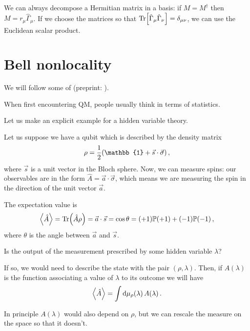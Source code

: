 \documentclass[main.tex]{subfiles}
\begin{document}

We can always decompose a Hermitian matrix in a basis: if \(M = M ^\dag\) then \(M = r_{\mu } \hat{\Gamma}_{\mu } \).
If we choose the matrices so that \(\Tr [\hat{\Gamma}_{\mu } \hat{\Gamma}_{\nu }] = \delta_{\mu \nu }\), we can use the Euclidean scalar product. 

\section{Bell nonlocality}

We will follow some of \cite[]{RevModPhysa} (preprint: \cite[]{brunnerBellNonlocality2014}). 

When first encountering QM, people usually think in terms of statistics. 

Let us make an explicit example for a hidden variable theory. 

Let us suppose we have a qubit which is described by the density matrix 
%
\begin{align}
\rho = \frac{1}{2} \qty(\mathbb{1} + \vec{s} \cdot \vec{\sigma})
\,,
\end{align}
%
where \(\vec{s}\) is a unit vector in the Bloch sphere. 
Now, we can measure spins: our observables are in the form \(\hat{A} = \vec{a} \cdot \vec{\sigma}\), which means we are measuring the spin in the direction of the unit vector \(\vec{a}\). 

The expectation value is 
%
\begin{align}
\expval{\hat{A}} = \Tr (\hat{A} \rho ) = \vec{a} \cdot \vec{s}
= \cos \theta  = (+1) \mathbb{P} (+1) + (-1) \mathbb{P}(-1)
\,,
\end{align}
%
where \(\theta \) is the angle between \(\vec{a}\) and \(\vec{s}\). 

Is the output of the measurement prescribed by some hidden variable \(\lambda \)?

If so, we would need to describe the state with the pair \((\rho , \lambda )\). Then, if \(A(\lambda )\) is the function associating a value of \(\lambda \) to its outcome we will have 
%
\begin{align}
\expval{\hat{A}} = \int \dd{\mu_{\rho }(\lambda )} A(\lambda )
\,.
\end{align}

In principle \(A(\lambda )\) would also depend on \(\rho \), but we can rescale the measure on the space so that it doesn't. 
\end{document}
